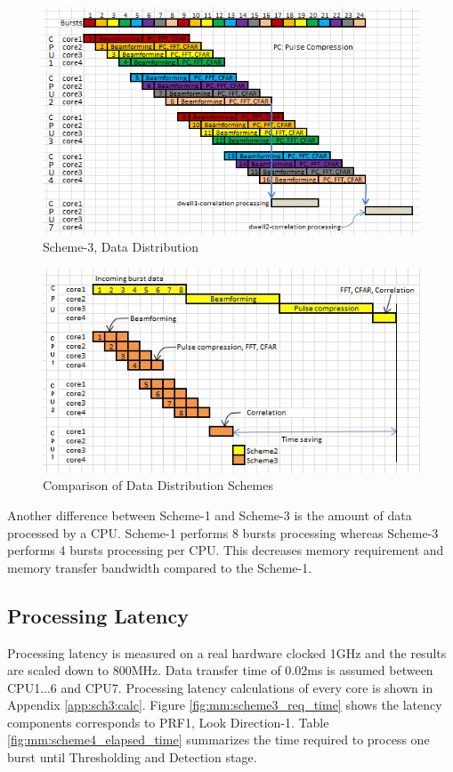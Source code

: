 \begin{figure}[h!]
	\centering
	\includegraphics[width=140mm]{figures/scheme4_data_distribution.png}
	\caption{Scheme-3, Data Distribution}
	\label{fig:mm:scheme4_data_distribution}
\end{figure}

\begin{figure}[h!]
	\centering
	\includegraphics[]{figures/scheme4_comparison}
	\caption{Comparison of Data Distribution Schemes}
	\label{fig:mm:scheme4_comparison}
\end{figure}

Another difference between Scheme-1 and Scheme-3 is the amount of data processed by a CPU. Scheme-1 performs 8 bursts processing whereas Scheme-3 performs 4 bursts processing per CPU. This decreases memory requirement and memory transfer bandwidth compared to the Scheme-1.

\subsection{Processing Latency}
\label{ss:mm:scheme4:latency}
Processing latency is measured on a real hardware clocked 1GHz and the results are scaled down to 800MHz. Data transfer time of 0.02ms is assumed between CPU1...6 and CPU7. Processing latency calculations of every core is shown in Appendix \ref{app:sch3:calc}. Figure \ref{fig:mm:scheme3_req_time} shows the latency components corresponds to PRF1, Look Direction-1.  Table \ref{fig:mm:scheme4_elapsed_time} summarizes the time required to process one burst until Thresholding and Detection stage.

